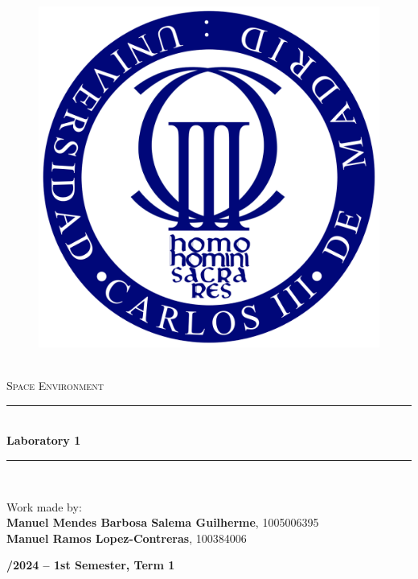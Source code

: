 \documentclass[10pt]{article}
\newcommand{\HRule}{\rule{\linewidth}{0.5mm}} %
\begin{document}
\begin{center}
    \begin{figure}
        \vspace{-1.0cm}
        \includegraphics[scale = 0.1, center]{Images/Logo_UC3M.svg.png} %
    \end{figure}
    \mbox{}\\[2.0cm]
    \textsc{\Huge Space Environment}\\[2.5cm]
    \HRule\\[0.4cm]
    {\large \bf {\selectfont Laboratory 1} \\[0.2cm]}
    \HRule
    \\[1.5cm]
\end{center}


\begin{center}

    \begin{flushleft}
        Work made by:\\[0.3cm] 
        \textbf{Manuel Mendes Barbosa Salema Guilherme}, 1005006395\\ 
        \textbf{Manuel Ramos Lopez-Contreras}, 100384006\\[6.0cm]
    \end{flushleft}
\end{center}
\begin{flushleft}
\end{flushleft}
\begin{center}
    \large \bf {}/2024 -- 1st Semester, Term 1
\end{center}
\end{document}

